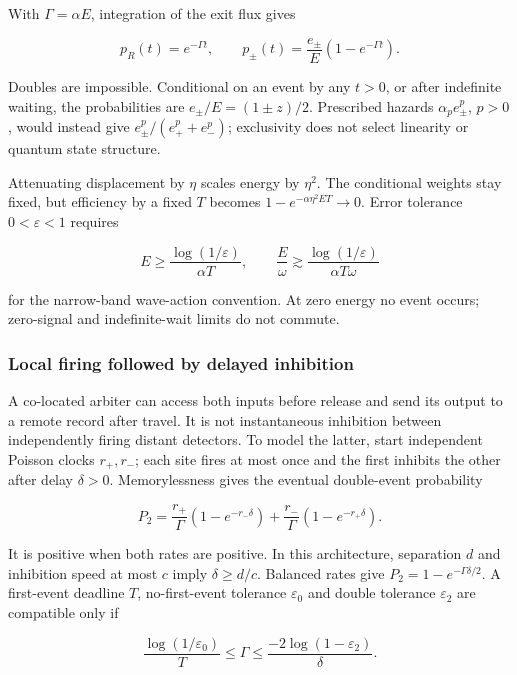 \documentclass[11pt,a4paper]{article}
\begin{document}
With \(\Gamma=\alpha E\), integration of the exit flux gives

\[p_R(t)=e^{-\Gamma t},\qquad
 p_\pm(t)=\frac{e_\pm}{E}(1-e^{-\Gamma t}).\]

Doubles are impossible. Conditional on an event by any \(t>0\), or after
indefinite waiting, the probabilities are \(e_\pm/E=(1\pm z)/2\).
Prescribed hazards \(\alpha_p e_\pm^p\), \(p>0\), would instead give
\(e_\pm^p/(e_+^p+e_-^p)\); exclusivity does not select linearity or
quantum state structure.

Attenuating displacement by \(\eta\) scales energy by \(\eta^2\). The
conditional weights stay fixed, but efficiency by a fixed \(T\) becomes
\(1-e^{-\alpha\eta^2ET}\to0\). Error tolerance \(0<\varepsilon<1\)
requires

\[E\ge\frac{\log(1/\varepsilon)}{\alpha T},\qquad
 \frac E\omega\gtrsim\frac{\log(1/\varepsilon)}{\alpha T\omega}\]

for the narrow-band wave-action convention. At zero energy no event
occurs; zero-signal and indefinite-wait limits do not commute.

\hypertarget{local-firing-followed-by-delayed-inhibition}{%
\subsubsection{Local firing followed by delayed
inhibition}\label{local-firing-followed-by-delayed-inhibition}}

A co-located arbiter can access both inputs before release and send its
output to a remote record after travel. It is not instantaneous
inhibition between independently firing distant detectors. To model the
latter, start independent Poisson clocks \(r_+,r_-\); each site fires at
most once and the first inhibits the other after delay \(\delta>0\).
Memorylessness gives the eventual double-event probability

\[P_2=\frac{r_+}{\Gamma}(1-e^{-r_-\delta})+
       \frac{r_-}{\Gamma}(1-e^{-r_+\delta}).\]

It is positive when both rates are positive. In this architecture,
separation \(d\) and inhibition speed at most \(c\) imply
\(\delta\ge d/c\). Balanced rates give \(P_2=1-e^{-\Gamma\delta/2}\). A
first-event deadline \(T\), no-first-event tolerance \(\varepsilon_0\)
and double tolerance \(\varepsilon_2\) are compatible only if

\[\frac{\log(1/\varepsilon_0)}{T}\le\Gamma
 \le\frac{-2\log(1-\varepsilon_2)}{\delta}.\]
\end{document}
